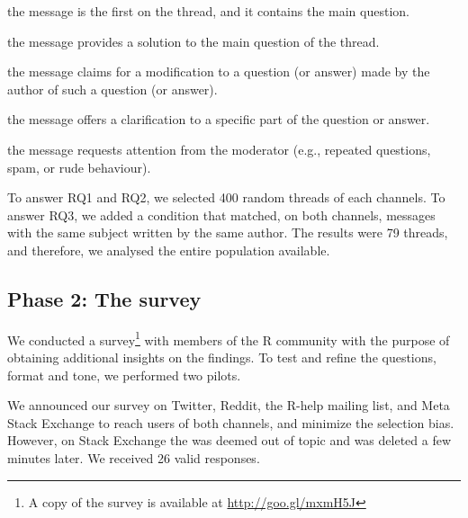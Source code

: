	\begin{description}[itemsep=3pt, topsep=2pt, leftmargin=3em, parsep=0pt]
		\item[Question:] the message is the first on the thread, and it contains the main question.
		\item[Answer:] the message provides a solution to the main question of the thread.
	 	\item[Update:] the message claims for a modification to a question (or answer) made by the author of such a question (or answer).
		\item[Comment:] the message offers a clarification to a specific part of the question or answer.
		\item[Flag:] the message requests attention from the moderator (e.g., repeated questions, spam, or rude behaviour).
	\end{description}

	To answer RQ1 and RQ2, we selected 400 random threads of each channels.
	To answer RQ3, we added a condition that matched, on both channels, messages with the same subject written by the same author.
	The results were 79 threads, and therefore, we analysed the entire population available. 

\subsection{Phase 2: The survey} 

    We conducted a survey\footnote{A copy of the survey is available at \url{http://goo.gl/mxmH5J}} with members of the R community with the purpose of obtaining additional insights on the findings.
    To test and refine the questions, format and tone, we performed two pilots.
    
    We announced our survey on Twitter, Reddit, the R-help mailing list, and Meta Stack Exchange to reach users of both channels, and minimize the selection bias.
    However, on Stack Exchange the was deemed out of topic and was deleted a few minutes later. We received 26 valid responses.

